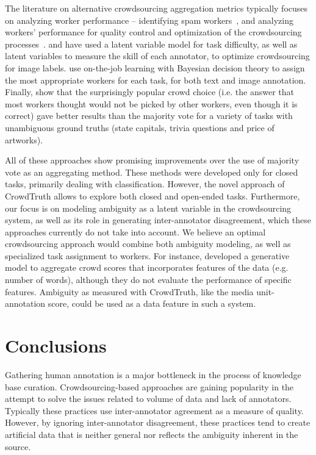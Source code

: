 The literature on alternative crowdsourcing aggregation metrics typically focuses on analyzing worker performance -- identifying spam workers~\cite{Bozzon:2013,Kittur2008,Ipeirotis:2010}, and analyzing workers' performance for quality control and optimization of the crowdsourcing processes~\cite{Singer:2013}. \citet{NIPS2009_3644} and \citet{welinder2010multidimensional} have used a latent variable model for task difficulty, as well as latent variables to measure the skill of each annotator, to optimize crowdsourcing for image labels. \citet{werling2015job} use on-the-job learning with Bayesian decision theory to assign the most appropriate workers for each task, for both text and image annotation. Finally, \citet{prelec2017solution} show that the surprisingly popular crowd choice (i.e. the answer that most workers thought would not be picked by other workers, even though it is correct) gave better results than the majority vote for a variety of tasks with unambiguous ground truths (state capitals, trivia questions and price of artworks).

All of these approaches show promising improvements over the use of majority vote as an aggregating method.  These methods were developed only for closed tasks, primarily dealing with classification.  However, the novel approach of CrowdTruth allows to explore both closed and open-ended tasks.  Furthermore, our focus is on modeling ambiguity as a latent variable in the crowdsourcing system, as well as its role in generating inter-annotator disagreement, which these approaches currently do not take into account. We believe an optimal crowdsourcing approach would combine both ambiguity modeling, as well as specialized task assignment to workers. For instance, \citet{felt2015early} developed a generative model to aggregate crowd scores that incorporates features of the data (e.g. number of words), although they do not evaluate the performance of specific features. Ambiguity as measured with CrowdTruth, like the media unit-annotation score, could be used as a data feature in such a system.


\section{Conclusions}
\label{sec:conclusions}

Gathering human annotation is a major bottleneck in the process of knowledge base curation. Crowdsourcing-based approaches are gaining popularity in the attempt to solve the issues related to volume of data and lack of annotators. Typically these practices use inter-annotator agreement as a measure of quality. However, by ignoring inter-annotator disagreement, these practices tend to create artificial data that is neither general nor reflects the ambiguity inherent in the source.

